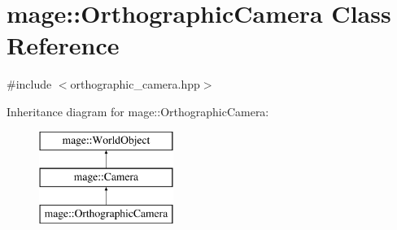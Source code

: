 \hypertarget{classmage_1_1_orthographic_camera}{}\section{mage\+:\+:Orthographic\+Camera Class Reference}
\label{classmage_1_1_orthographic_camera}


{\ttfamily \#include $<$orthographic\+\_\+camera.\+hpp$>$}

Inheritance diagram for mage\+:\+:Orthographic\+Camera\+:\begin{figure}[H]
\begin{center}
\leavevmode
\includegraphics[height=3.000000cm]{classmage_1_1_orthographic_camera}
\end{center}
\end{figure}
